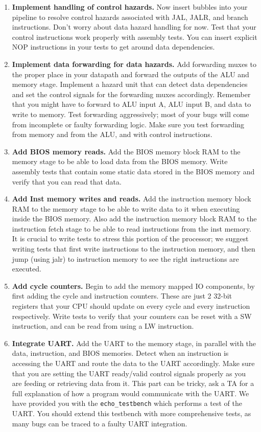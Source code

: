 \documentclass[11pt]{article}
\begin{document}
\begin{enumerate}
	\item \textbf{Implement handling of control hazards.} Now insert bubbles into your pipeline to resolve control hazards associated with JAL, JALR, and branch instructions. Don't worry about data hazard handling for now. Test that your control instructions work properly with assembly tests. You can insert explicit NOP instructions in your tests to get around data dependencies.
	
	\item \textbf{Implement data forwarding for data hazards.} Add forwarding muxes to the proper place in your datapath and forward the outputs of the ALU and memory stage. Implement a hazard unit that can detect data dependencies and set the control signals for the forwarding muxes accordingly. Remember that you might have to forward to ALU input A, ALU input B, and data to write to memory. Test forwarding aggressively; most of your bugs will come from incomplete or faulty forwarding logic. Make sure you test forwarding from memory and from the ALU, and with control instructions.
	
	\item \textbf{Add BIOS memory reads.} Add the BIOS memory block RAM to the memory stage to be able to load data from the BIOS memory. Write assembly tests that contain some static data stored in the BIOS memory and verify that you can read that data.
	
	\item \textbf{Add Inst memory writes and reads.} Add the instruction memory block RAM to the memory stage to be able to write data to it when executing inside the BIOS memory. Also add the instruction memory block RAM to the instruction fetch stage to be able to read instructions from the inst memory. It is crucial to write tests to stress this portion of the processor; we suggest writing tests that first write instructions to the instruction memory, and then jump (using jalr) to instruction memory to see the right instructions are executed.
	
	\item \textbf{Add cycle counters.} Begin to add the memory mapped IO components, by first adding the cycle and instruction counters. These are just 2 32-bit registers that your CPU should update on every cycle and every instruction respectively. Write tests to verify that your counters can be reset with a SW instruction, and can be read from using a LW instruction.
	
	\item \textbf{Integrate UART.} Add the UART to the memory stage, in parallel with the data, instruction, and BIOS memories. Detect when an instruction is accessing the UART and route the data to the UART accordingly. Make sure that you are setting the UART ready/valid control signals properly as you are feeding or retrieving data from it. This part can be tricky, ask a TA for a full explanation of how a program would communicate with the UART. We have provided you with the \verb|echo_testbench| which performs a test of the UART. You should extend this testbench with more comprehensive tests, as many bugs can be traced to a faulty UART integration.
	

\end{enumerate}
\end{document}

